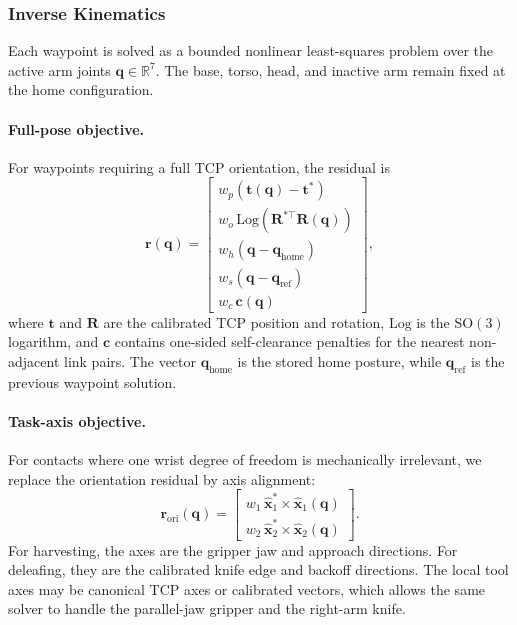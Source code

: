 \subsubsection{Inverse Kinematics}
\label{app:ik}

Each waypoint is solved as a bounded nonlinear least-squares problem
over the active arm joints $\mathbf{q}\in\mathbb{R}^7$.  The base,
torso, head, and inactive arm remain fixed at the home configuration.

\paragraph{Full-pose objective.}
For waypoints requiring a full TCP orientation, the residual is
%
\begin{equation}
  \mathbf{r}(\mathbf{q})
  =
  \begin{bmatrix}
    w_p(\mathbf{t}(\mathbf{q})-\mathbf{t}^*) \\
    w_o\,\mathrm{Log}(\mathbf{R}^{*\top}\mathbf{R}(\mathbf{q})) \\
    w_h(\mathbf{q}-\mathbf{q}_{\mathrm{home}}) \\
    w_s(\mathbf{q}-\mathbf{q}_{\mathrm{ref}}) \\
    w_c\,\mathbf{c}(\mathbf{q})
  \end{bmatrix},
  \label{eq:ik_residual}
\end{equation}
%
where $\mathbf{t}$ and $\mathbf{R}$ are the calibrated TCP position
and rotation, $\mathrm{Log}$ is the $\mathrm{SO}(3)$ logarithm, and
$\mathbf{c}$ contains one-sided self-clearance penalties for the
nearest non-adjacent link pairs.  The vector
$\mathbf{q}_{\mathrm{home}}$ is the stored home posture, while
$\mathbf{q}_{\mathrm{ref}}$ is the previous waypoint solution.

\paragraph{Task-axis objective.}
For contacts where one wrist degree of freedom is mechanically
irrelevant, we replace the orientation residual by axis alignment:
%
\begin{equation}
  \mathbf{r}_{\mathrm{ori}}(\mathbf{q})
  =
  \begin{bmatrix}
    w_1\,\hat{\mathbf{x}}_1^* \times \hat{\mathbf{x}}_1(\mathbf{q}) \\
    w_2\,\hat{\mathbf{x}}_2^* \times \hat{\mathbf{x}}_2(\mathbf{q})
  \end{bmatrix}.
  \label{eq:task_axis_residual}
\end{equation}
%
For harvesting, the axes are the gripper jaw and approach directions.
For deleafing, they are the calibrated knife edge and backoff
directions.  The local tool axes may be canonical TCP axes or
calibrated vectors, which allows the same solver to handle the
parallel-jaw gripper and the right-arm knife.

